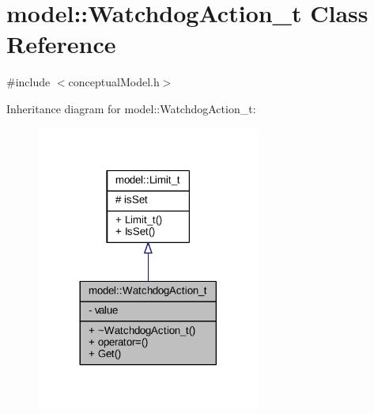 \hypertarget{classmodel_1_1_watchdog_action__t}{}\section{model\+:\+:Watchdog\+Action\+\_\+t Class Reference}
\label{classmodel_1_1_watchdog_action__t}


{\ttfamily \#include $<$conceptual\+Model.\+h$>$}



Inheritance diagram for model\+:\+:Watchdog\+Action\+\_\+t\+:
\nopagebreak
\begin{figure}[H]
\begin{center}
\leavevmode
\includegraphics[width=209pt]{classmodel_1_1_watchdog_action__t__inherit__graph}
\end{center}
\end{figure}


